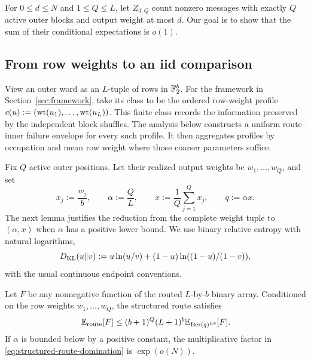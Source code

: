 For $0\le d\le N$ and $1\le Q\le L$, let $Z_{d,Q}$ count nonzero messages
with exactly $Q$ active outer blocks and output weight at most $d$.
Our goal is to show that the sum of their conditional expectations is $o(1)$.

\subsection{From row weights to an iid comparison}

View an outer word as an $L$-tuple of rows in $\mathbb F_2^b$. For the framework in
Section~\ref{sec:framework}, take its class to be the ordered row-weight
profile $c(u):=(\operatorname{wt}(u_1),\ldots,\operatorname{wt}(u_L))$.
This finite class records the information preserved by the independent block
shuffles. The analysis below constructs a uniform route--inner failure
envelope for every such profile. It then aggregates profiles by occupation and
mean row weight where those coarser parameters suffice.

Fix $Q$ active outer positions. Let their realized output weights be
$w_1,\ldots,w_Q$, and set
\[
  x_j:=\frac{w_j}{b},
  \qquad
  \alpha:=\frac QL,
  \qquad
  x:=\frac1Q\sum_{j=1}^Qx_j,
  \qquad
  q:=\alpha x.
\]
The next lemma justifies the reduction from the complete weight tuple to
$(\alpha,x)$ when $\alpha$ has a positive lower bound.
We use binary relative entropy with natural logarithms,
\[
 D_{\rm KL}(u\Vert v)
 :=u\ln(u/v)+(1-u)\ln((1-u)/(1-v)),
\]
with the usual continuous endpoint conventions.

\begin{lemma}
\label{lem:structured-route-domination}
Let $F$ be any nonnegative function of the routed $L$-by-$b$ binary array.
Conditioned on the row weights $w_1,\ldots,w_Q$, the structured route
satisfies
\begin{equation}
  \mathbb E_{\rm route}[F]
  \le
  (b+1)^Q(L+1)^b
  \mathbb E_{\operatorname{Ber}(q)^{Lb}}[F].
  \label{eq:structured-route-domination}
\end{equation}
If $\alpha$ is bounded below by a positive constant, the multiplicative
factor in \eqref{eq:structured-route-domination} is $\exp(o(N))$.
\end{lemma}

